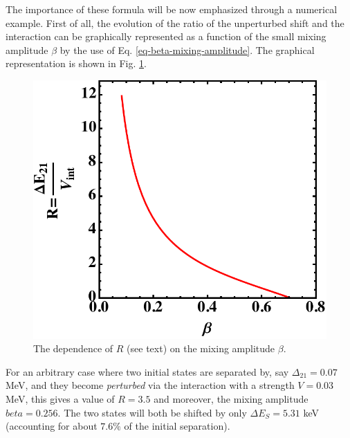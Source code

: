 The importance of these formula will be now emphasized through a numerical example. First of all, the evolution of the ratio of the unperturbed shift and the interaction can be graphically represented as a function of the small mixing amplitude $\beta$ by the use of Eq. \ref{eq-beta-mixing-amplitude}. The graphical representation is shown in Fig. \ref{fig-beta-mixing-amplitude}.

\begin{figure}
    \centering
    \includegraphics[scale=0.7]{Chapters/Figures/beta_mixing_amplitude.pdf}
    \caption{The dependence of $R$ (see text) on the mixing amplitude $\beta$.}
    \label{fig-beta-mixing-amplitude}
\end{figure}

For an arbitrary case where two initial states are separated by, say $\Delta_{21}=0.07$ MeV, and they become \emph{perturbed} via the interaction with a strength $V=0.03$ MeV, this gives a value of $R=3.5$ and moreover, the mixing amplitude $beta=0.256$. The two states will both be shifted by only $\Delta E_S=5.31$ keV (accounting for about $7.6 \%$ of the initial separation).